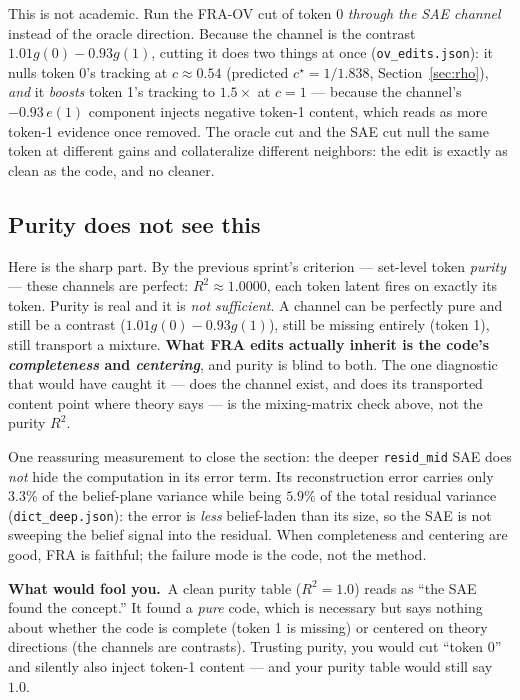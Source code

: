 \documentclass[11pt]{article}
\newcommand{\gv}[1]{g(#1)}
\newcommand{\fool}[1]{\par\smallskip\noindent%
  \textbf{\textcolor{red!60!black}{What would fool you.}}~#1\par\smallskip}
\begin{document}
This is not academic. Run the FRA-OV cut of token 0 \emph{through the SAE
channel} instead of the oracle direction. Because the channel is the contrast
$1.01\gv{0}-0.93\gv{1}$, cutting it does two things at once
(\texttt{ov\_edits.json}): it nulls token 0's tracking at
$c\approx0.54$ (predicted $c^\star=1/1.838$, Section~\ref{sec:rho}), \emph{and}
it \emph{boosts} token 1's tracking to $1.5\times$ at $c=1$ --- because the
channel's $-0.93\,e(1)$ component injects negative token-1 content, which reads
as more token-1 evidence once removed. The oracle cut and the SAE cut null the
same token at different gains and collateralize different neighbors: the edit
is exactly as clean as the code, and no cleaner.

\subsection{Purity does not see this}

Here is the sharp part. By the previous sprint's criterion --- set-level token
\emph{purity} --- these channels are perfect: $R^2\approx1.0000$, each token
latent fires on exactly its token. Purity is real and it is \emph{not
sufficient}. A channel can be perfectly pure and still be a contrast
($1.01\gv{0}-0.93\gv{1}$), still be missing entirely (token 1), still transport
a mixture. \textbf{What FRA edits actually inherit is the code's
\emph{completeness} and \emph{centering}}, and purity is blind to both. The one
diagnostic that would have caught it --- does the channel exist, and does its
transported content point where theory says --- is the mixing-matrix check
above, not the purity $R^2$.

One reassuring measurement to close the section: the deeper \texttt{resid\_mid}
SAE does \emph{not} hide the computation in its error term. Its reconstruction
error carries only $3.3\%$ of the belief-plane variance while being $5.9\%$ of
the total residual variance (\texttt{dict\_deep.json}): the error is
\emph{less} belief-laden than its size, so the SAE is not sweeping the belief
signal into the residual. When completeness and centering are good, FRA is
faithful; the failure mode is the code, not the method.

\fool{A clean purity table ($R^2=1.0$) reads as ``the SAE found the concept.''
It found a \emph{pure} code, which is necessary but says nothing about whether
the code is complete (token 1 is missing) or centered on theory directions (the
channels are contrasts). Trusting purity, you would cut ``token 0'' and silently
also inject token-1 content --- and your purity table would still say $1.0$.}
\end{document}
